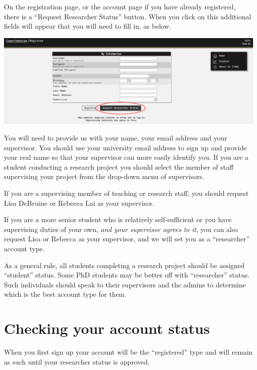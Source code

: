 \documentclass[]{book}
\begin{document}
On the registration page, or the account page if you have already registered, there is a ``Request Researcher Status'' button. When you click on this additional fields will appear that you will need to fill in, as below.

\includegraphics{images/screenshots/requesting_status.png}

You will need to provide us with your name, your email address and your supervisor. You should use your university email address to sign up and provide your real name so that your supervisor can more easily identify you. If you are a student conducting a research project you should select the member of staff supervising your project from the drop-down menu of supervisors.

\begin{info}
If you are a supervising member of teaching or research staff, you
should request Lisa DeBruine or Rebecca Lai as your supervisor.

If you are a more senior student who is relatively self-sufficient or
you have supervising duties of your own, \emph{and your supervisor
agrees to it}, you can also request Lisa or Rebecca as your supervisor,
and we will set you as a ``researcher'' account type.

As a general rule, all students completing a research project should be
assigned ``student'' status. Some PhD students may be better off with
``researcher'' status. Such individuals should speak to their
supervisors and the admins to determine which is the best account type
for them.
\end{info}

\hypertarget{checking-your-account-status}{%
\section{Checking your account status}\label{checking-your-account-status}}

When you first sign up your account will be the ``registered'' type and will remain as such until your researcher status is approved.
\end{document}

